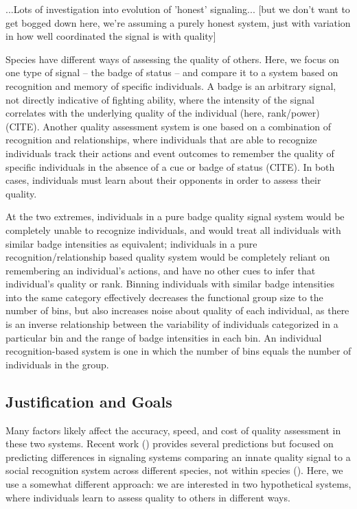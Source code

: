 ...Lots of investigation into evolution of 'honest' signaling...  [but we don't want to get bogged down here, we're assuming a purely honest system, just with variation in how well coordinated the signal is with quality]



Species have different ways of assessing the quality of others. Here, we focus on one type of signal -- the badge of status -- and compare it to a system based on recognition and memory of specific individuals. A badge is an arbitrary signal, not directly indicative of fighting ability, where the intensity of the signal correlates with the underlying quality of the individual (here, rank/power) (CITE). Another quality assessment system is one based on a combination of  recognition and relationships, where individuals that are able to recognize individuals track their actions and event outcomes to remember the quality of specific individuals in the absence of a cue or badge of status (CITE). In both cases, individuals must learn about their opponents in order to assess their quality.

At the two extremes, individuals in a pure badge quality signal system would be completely unable to recognize individuals, and would treat all individuals with similar badge intensities as equivalent; individuals in a pure recognition/relationship based quality system would be completely reliant on remembering an individual's actions, and have no other cues to infer that individual's quality or rank. Binning individuals with similar badge intensities into the same category effectively decreases the functional group size to the number of bins, but also increases noise about quality of each individual, as there is an inverse relationship between the variability of individuals categorized in a particular bin and the range of badge intensities in each bin. An individual recognition-based system is one in which the number of bins equals the number of individuals in the group.  

\subsection*{Justification and Goals}

Many factors likely affect the accuracy, speed, and cost of quality assessment in these two systems. Recent work (\cite{sheehan2016evotradeoff}) provides several predictions but focused on predicting differences in signaling systems comparing an innate quality signal to a social recognition system across different species, not within species (\cite{sheehan2016response}). Here, we use a somewhat different approach: we are interested in two hypothetical systems, where individuals learn to assess quality to others in different ways. 

